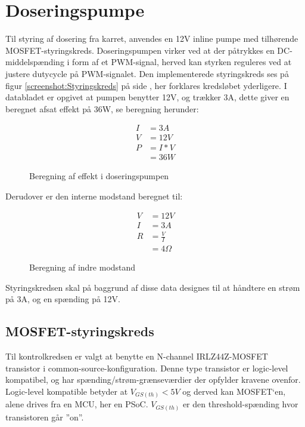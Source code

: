 
\section{Doseringspumpe}
Til styring af dosering fra karret, anvendes en 12V inline pumpe  med tilhørende MOSFET-styringskreds. 
Doseringspumpen virker ved at der påtrykkes en DC-middelspænding i form af et PWM-signal, herved kan styrken reguleres ved at justere dutycycle på PWM-signalet.
Den implementerede styringskreds ses på figur \ref{screenshot:Styringskreds} på side \pageref{screenshot:Styringskreds}, her forklares kredsløbet yderligere.
I databladet er opgivet at pumpen benytter 12V, og trækker 3A, dette giver en beregnet afsat effekt på 36W, se beregning herunder:

\begin{figure}[!h]
    \begin{align*}
        I &= 3 A \\ 
        V &= 12 V \\
        P &= I*V \\ 
        &= 36W
    \end{align*}
\label{eq:PumpeA}
\caption{Beregning af effekt i doseringspumpen}
\end{figure}

Derudover er den interne modstand beregnet til:

\begin{figure}[!h]
	\begin{align*}
   		V &= 12 V \\ 
        I &= 3 A \\
        R &= \frac{V}{I} \\ 
        &= 4 \Omega
  	\end{align*}
\label{eq:pumpeOhm}
\caption{Beregning af indre modstand}
\end{figure}

Styringskredsen skal på baggrund af disse data designes til at håndtere en strøm på 3A, og en spænding på 12V. 


\newpage
\subsection{MOSFET-styringskreds}
Til kontrolkredsen er valgt at benytte en N-channel IRLZ44Z-MOSFET transistor i common-source-konfiguration. Denne type transistor er logic-level kompatibel, og har spænding/strøm-grænseværdier der opfylder kravene ovenfor.  
Logic-level kompatible betyder at $ V_{GS(th)} < 5V $ og derved kan MOSFET`en, alene drives fra en MCU, her en PSoC.
$ V_{GS(th)} $ er den threshold-spænding hvor transistoren går ”on”.



